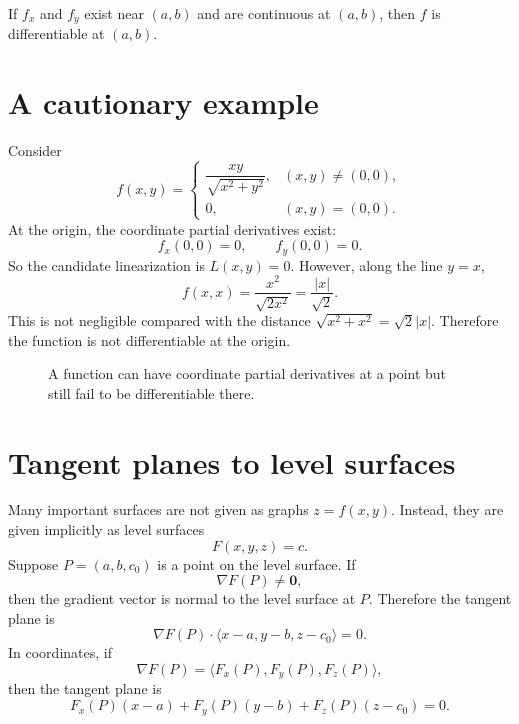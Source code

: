 \documentclass[11pt]{article}
\newcommand{\grad}{\nabla}
\begin{document}
\begin{tipbox}
If $f_x$ and $f_y$ exist near $(a,b)$ and are continuous at $(a,b)$, then $f$ is differentiable at $(a,b)$.
\end{tipbox}

\section{A cautionary example}

Consider
\[
f(x,y)=
\begin{cases}
\dfrac{xy}{\sqrt{x^2+y^2}}, & (x,y)\ne (0,0),\\[0.6em]
0, & (x,y)=(0,0).
\end{cases}
\]
At the origin, the coordinate partial derivatives exist:
\[
f_x(0,0)=0,\qquad f_y(0,0)=0.
\]
So the candidate linearization is $L(x,y)=0$. However, along the line $y=x$,
\[
f(x,x)=\frac{x^2}{\sqrt{2x^2}}=\frac{|x|}{\sqrt2}.
\]
This is not negligible compared with the distance $\sqrt{x^2+x^2}=\sqrt2|x|$. Therefore the function is not differentiable at the origin.

\begin{figure}[H]
\centering
{}
\caption{A function can have coordinate partial derivatives at a point but still fail to be differentiable there.}
\end{figure}

\section{Tangent planes to level surfaces}

Many important surfaces are not given as graphs $z=f(x,y)$. Instead, they are given implicitly as level surfaces
\[
F(x,y,z)=c.
\]
Suppose $P=(a,b,c_0)$ is a point on the level surface. If
\[
\grad F(P)\ne \mathbf 0,
\]
then the gradient vector is normal to the level surface at $P$. Therefore the tangent plane is
\[
\grad F(P)\cdot \langle x-a,y-b,z-c_0\rangle=0.
\]
In coordinates, if
\[
\grad F(P)=\langle F_x(P),F_y(P),F_z(P)\rangle,
\]
then the tangent plane is
\[
F_x(P)(x-a)+F_y(P)(y-b)+F_z(P)(z-c_0)=0.
\]
\end{document}

